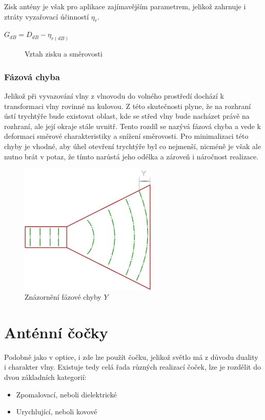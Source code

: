 \renewcommand{\figurename}{Obrázek}
Zisk antény je však pro aplikace zajímavějším parametrem, jelikož zahrnuje i ztráty vyzařovací účinností $\eta_r$.
\renewcommand{\figurename}{}
\begin{center}
\LARGE{$G_{dB} = D_{dB} - \eta_{r(dB)}$}
\begin{figure}[h]
\caption{Vztah zisku a směrovosti}
\label{fig:hornG}
\end{figure}
\end{center}
\renewcommand{\figurename}{Obrázek}

\subsubsection{Fázová chyba}
Jelikož při vyvazování vlny z vlnovodu do volného prostředí dochází k transformaci vlny rovinné na kulovou. Z této skutečnosti plyne, že na rozhraní ústí trychtýře bude existovat oblast, kde se střed vlny bude nacházet právě na rozhraní, ale její okraje stále uvnitř. Tento rozdíl se nazývá fázová chyba a vede k deformaci směrové charakteristiky a snížení směrovosti. Pro minimalizaci této chyby je vhodné, aby úhel otevření trychtýře byl co nejmenší, nicméně je však ale nutno brát v potaz, že tímto narůstá jeho odélka a zároveň i náročnost realizace.
\begin{figure}[h]
\begin{center}
\includegraphics[width=6.5cm]{pics/hornErr}
\caption{Znázornění fázové chyby $Y$}
\label{fig:HornErr}
\end{center}
\end{figure}


\newpage
\section{Anténní čočky}
Podobně jako v optice, i zde lze použít čočku, jelikož světlo má z důvodu duality i charakter vlny. Existuje tedy celá řada různých realizací čoček, lze je rozdělit do dvou základních kategorií:
\begin{itemize}
\item Zpomalovací, neboli dielektrické
\item Urychlující, neboli kovové
\end{itemize}

